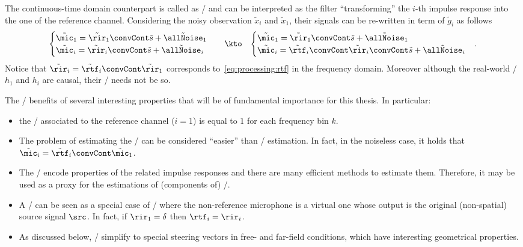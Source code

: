 The continuous-time domain counterpart is called as \ReIRdef/ and can be interpreted as the filter ``transforming'' the $i$-th impulse response into the one of the reference channel.
Considering the noisy observation $\tilde{x}_i$ and $\tilde{x}_1$, their signals can be re-written in term of $\tilde{g}_i$ as follows
\begin{equation}
    \begin{matrix}
    \begin{cases}
        \tilde{\mic}_1 = \tilde{\rir}_1 \convCont \tilde{s} + \tilde{\allNoise}_1 \\
        \tilde{\mic}_i = \tilde{\rir}_i \convCont \tilde{s} + \tilde{\allNoise}_i
    \end{cases} & \kto  & \begin{cases}
        \tilde{\mic}_1 = \tilde{\rir}_1 \convCont \tilde{s} + \tilde{\allNoise}_1 \\
        \tilde{\mic}_i = \tilde{\rtf}_i \convCont \tilde{\rir}_i \convCont \tilde{s} + \tilde{\allNoise}_i
    \end{cases}
    \end{matrix}
    .
\end{equation}
Notice that $\tilde{\rir}_i = \tilde{\rtf}_i \convCont \tilde{\rir}_1$ corresponds to~\cref{eq:processing:rtf} in the frequency domain.
Moreover although the real-world \RIRs/ $h_1$ and $h_i$ are causal, their \ReTF/ needs not be so.

The \ReTFs/ benefits of several interesting properties that will be of fundamental importance for this thesis.
In particular:
\begin{itemize}
    \item the \ReTF/ associated to the reference channel ($i = 1$) is equal to $1$ for each frequency bin $k$.
    \item The problem of estimating the \ReTF/ can be considered ``easier'' than \RIRs/ estimation.
    In fact, in the noiseless case, it holds that $\tilde{\mic}_i = \tilde{\rtf}_i \convCont \tilde{\mic}_1$.
    \item The \ReTFs/ encode properties of the related impulse responses and there are many efficient methods to estimate them.
    Therefore, it may be used as a proxy for the estimations of (components of) \RIRs/.
    \item A \RIR/ can be seen as a special case of \ReTF/ where the non-reference microphone is a virtual one whose
    output is the original (non-spatial) source signal $\src$. In fact, if $\rir_1 = \delta$ then $\rtf_i = \rir_i$.
    \item As discussed below, \ReTFs/ simplify to special steering vectors in free- and far-field conditions, which have interesting geometrical properties.
\end{itemize}

